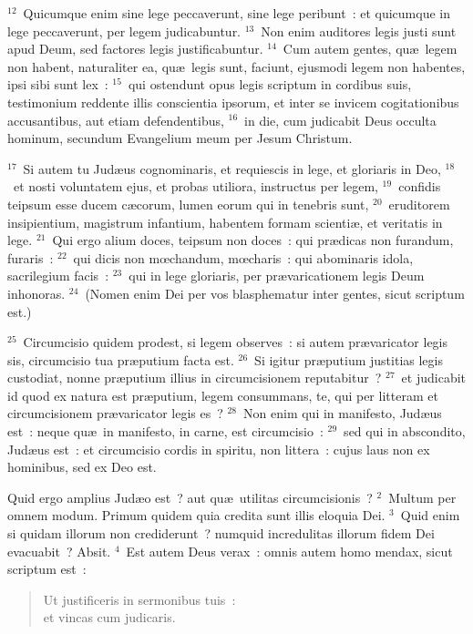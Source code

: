 ${}^{12}$~Quicumque enim sine lege peccaverunt, sine lege peribunt~: et quicumque in lege peccaverunt, per legem judicabuntur.
${}^{13}$~Non enim auditores legis justi sunt apud Deum, sed factores legis justificabuntur.
${}^{14}$~Cum autem gentes, qu\ae\ legem non habent, naturaliter ea, qu\ae\ legis sunt, faciunt, ejusmodi legem non habentes, ipsi sibi sunt lex~:
${}^{15}$~qui ostendunt opus legis scriptum in cordibus suis, testimonium reddente illis conscientia ipsorum, et inter se invicem cogitationibus accusantibus, aut etiam defendentibus,
${}^{16}$~in die, cum judicabit Deus occulta hominum, secundum Evangelium meum per Jesum Christum.


${}^{17}$~Si autem tu Jud\ae us cognominaris, et requiescis in lege, et gloriaris in Deo,
${}^{18}$~et nosti voluntatem ejus, et probas utiliora, instructus per legem,
${}^{19}$~confidis teipsum esse ducem c\ae corum, lumen eorum qui in tenebris sunt,
${}^{20}$~eruditorem insipientium, magistrum infantium, habentem formam scienti\ae , et veritatis in lege.
${}^{21}$~Qui ergo alium doces, teipsum non doces~: qui pr\ae dicas non furandum, furaris~:
${}^{22}$~qui dicis non mœchandum, mœcharis~: qui abominaris idola, sacrilegium facis~:
${}^{23}$~qui in lege gloriaris, per pr\ae varicationem legis Deum inhonoras.
${}^{24}$~(Nomen enim Dei per vos blasphematur inter gentes, sicut scriptum est.)


${}^{25}$~Circumcisio quidem prodest, si legem observes~: si autem pr\ae varicator legis sis, circumcisio tua pr\ae putium facta est.
${}^{26}$~Si igitur pr\ae putium justitias legis custodiat, nonne pr\ae putium illius in circumcisionem reputabitur~?
${}^{27}$~et judicabit id quod ex natura est pr\ae putium, legem consummans, te, qui per litteram et circumcisionem pr\ae varicator legis es~?
${}^{28}$~Non enim qui in manifesto, Jud\ae us est~: neque qu\ae\ in manifesto, in carne, est circumcisio~:
${}^{29}$~sed qui in abscondito, Jud\ae us est~: et circumcisio cordis in spiritu, non littera~: cujus laus non ex hominibus, sed ex Deo est.

\lettrine[lines=3,image=true,loversize=0.05,lraise=-0.03]{Q}{}uid ergo amplius Jud\ae o est~? aut qu\ae\ utilitas circumcisionis~?
${}^{2}$~Multum per omnem modum. Primum quidem quia credita sunt illis eloquia Dei.
${}^{3}$~Quid enim si quidam illorum non crediderunt~? numquid incredulitas illorum fidem Dei evacuabit~? Absit.
${}^{4}$~Est autem Deus verax~: omnis autem homo mendax, sicut scriptum est~: \begin{flushleft}\begin{verse}Ut justificeris in sermonibus tuis~:\\ et vincas cum judicaris.\end{verse}\end{flushleft}


